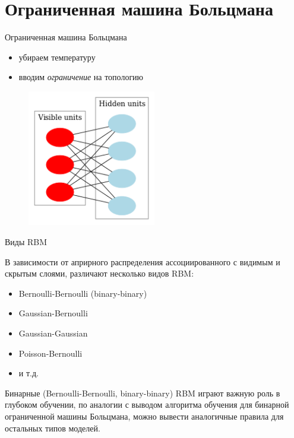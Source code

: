 \documentclass[10pt]{beamer}
\begin{document}
\section{Ограниченная машина Больцмана}

\begin{frame}{Ограниченная машина Больцмана}

\begin{itemize}
	\item убираем температуру
	\item вводим \textit{ограничение} на топологию
\end{itemize}

\begin{figure}[h!]
  \centering
  \includegraphics[width=0.5\textwidth]{images/rbm_graph.png}
\end{figure}

\end{frame}


\begin{frame}{Виды RBM}

В зависимости от априрного распределения ассоциированного с видимым и скрытым слоями, различают несколько видов RBM:
\begin{itemize}
	\item Bernoulli-Bernoulli (binary-binary)
	\item Gaussian-Bernoulli
	\item Gaussian-Gaussian
	\item Poisson-Bernoulli
	\item и т.д.
\end{itemize}

Бинарные (Bernoulli-Bernoulli, binary-binary) RBM играют важную роль в глубоком обучении, по аналогии с выводом алгоритма обучения для бинарной ограниченной машины Больцмана, можно вывести аналогичные правила для остальных типов моделей.

\end{frame}
\end{document}
